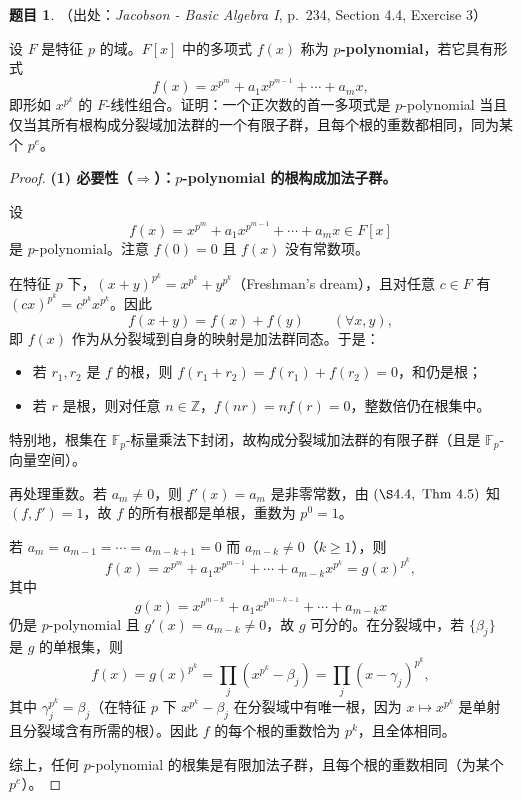 \documentclass[a4paper]{ctexart}
\theoremstyle{definition}
\newtheorem{example}{题目}[section]
\theoremstyle{analysis}
\theoremstyle{plain}
\begin{document}
\begin{example}
（出处：\textit{Jacobson - Basic Algebra I}, p.~234, Section 4.4, Exercise 3）

设 \(F\) 是特征 \(p\) 的域。\(F[x]\) 中的多项式 \(f(x)\) 称为 \textbf{\(p\)-polynomial}，若它具有形式
\[
  f(x)=x^{p^m}+a_1x^{p^{m-1}}+\cdots+a_mx,
\]
即形如 \(x^{p^k}\) 的 \(F\)-线性组合。证明：一个正次数的首一多项式是 \(p\)-polynomial 当且仅当其所有根构成分裂域加法群的一个有限子群，且每个根的重数都相同，同为某个 \(p^e\)。

\begin{proof}
\textbf{(1) 必要性（\(\Rightarrow\)）：\(p\)-polynomial 的根构成加法子群。}

设
\[
  f(x)=x^{p^m}+a_1x^{p^{m-1}}+\cdots+a_mx\in F[x]
\]
是 \(p\)-polynomial。注意 \(f(0)=0\) 且 \(f(x)\) 没有常数项。

在特征 \(p\) 下，\((x+y)^{p^k}=x^{p^k}+y^{p^k}\)（Freshman's dream），且对任意 \(c\in F\) 有 \((c x)^{p^k}=c^{p^k}x^{p^k}\)。因此
\[
  f(x+y)=f(x)+f(y)\qquad (\forall x,y),
\]
即 \(f(x)\) 作为从分裂域到自身的映射是加法群同态。于是：
\begin{itemize}
  \item 若 \(r_1,r_2\) 是 \(f\) 的根，则 \(f(r_1+r_2)=f(r_1)+f(r_2)=0\)，和仍是根；
  \item 若 \(r\) 是根，则对任意 \(n\in\mathbb Z\)，\(f(nr)=nf(r)=0\)，整数倍仍在根集中。
\end{itemize}
特别地，根集在 \(\mathbb F_p\)-标量乘法下封闭，故构成分裂域加法群的有限子群（且是 \(\mathbb F_p\)-向量空间）。

再处理重数。若 \(a_m\neq 0\)，则 \(f'(x)=a_m\) 是非零常数，由 \((\S 4.4,\ \mathrm{Thm}\ 4.5)\) 知 \((f,f')=1\)，故 \(f\) 的所有根都是单根，重数为 \(p^0=1\)。

若 \(a_m=a_{m-1}=\cdots=a_{m-k+1}=0\) 而 \(a_{m-k}\neq 0\)（\(k\ge 1\)），则
\[
  f(x)=x^{p^m}+a_1x^{p^{m-1}}+\cdots+a_{m-k}x^{p^k}
      =g(x)^{p^k},
\]
其中
\[
  g(x)=x^{p^{m-k}}+a_1x^{p^{m-k-1}}+\cdots+a_{m-k}x
\]
仍是 \(p\)-polynomial 且 \(g'(x)=a_{m-k}\neq 0\)，故 \(g\) 可分的。在分裂域中，若 \(\{\beta_j\}\) 是 \(g\) 的单根集，则
\[
  f(x)=g(x)^{p^k}=\prod_j (x^{p^k}-\beta_j)=\prod_j (x-\gamma_j)^{p^k},
\]
其中 \(\gamma_j^{p^k}=\beta_j\)（在特征 \(p\) 下 \(x^{p^k}-\beta_j\) 在分裂域中有唯一根，因为 \(x\mapsto x^{p^k}\) 是单射且分裂域含有所需的根）。因此 \(f\) 的每个根的重数恰为 \(p^k\)，且全体相同。

综上，任何 \(p\)-polynomial 的根集是有限加法子群，且每个根的重数相同（为某个 \(p^e\)）。


\end{proof}
\end{example}
\end{document}
